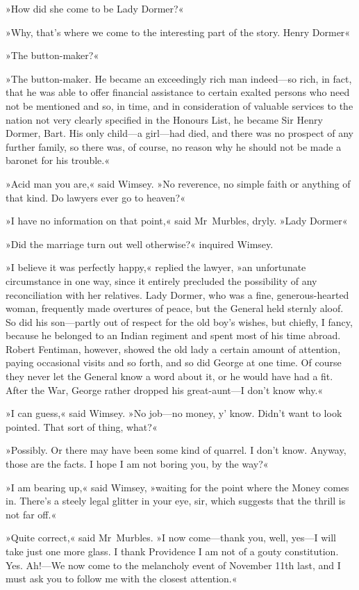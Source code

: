 »How did she come to be Lady Dormer?«

»Why, that's where we come to the interesting part of the story. Henry Dormer\longdash«

»The button-maker?«

»The button-maker. He became an exceedingly rich man indeed—so rich, in fact, that he was able to offer financial assistance to certain exalted persons who need not be mentioned and so, in time, and in consideration of valuable services to the nation not very clearly specified in the Honours List, he became Sir Henry Dormer, Bart. His only child—a girl—had died, and there was no prospect of any further family, so there was, of course, no reason why he should not be made a baronet for his trouble.«

»Acid man you are,« said Wimsey. »No reverence, no simple faith or anything of that kind. Do lawyers ever go to heaven?«

»I have no information on that point,« said Mr~Murbles, dryly. »Lady Dormer\longdash«

»Did the marriage turn out well otherwise?« inquired Wimsey.

»I believe it was perfectly happy,« replied the lawyer, »an unfortunate circumstance in one way, since it entirely precluded the possibility of any reconciliation with her relatives. Lady Dormer, who was a fine, generous-hearted woman, frequently made overtures of peace, but the General held sternly aloof. So did his son—partly out of respect for the old boy's wishes, but chiefly, I fancy, because he belonged to an Indian regiment and spent most of his time abroad. Robert Fentiman, however, showed the old lady a certain amount of attention, paying occasional visits and so forth, and so did George at one time. Of course they never let the General know a word about it, or he would have had a fit. After the War, George rather dropped his great-aunt—I don't know why.«

»I can guess,« said Wimsey. »No job—no money, y' know. Didn't want to look pointed. That sort of thing, what?«

»Possibly. Or there may have been some kind of quarrel. I don't know. Anyway, those are the facts. I hope I am not boring you, by the way?«

»I am bearing up,« said Wimsey, »waiting for the point where the Money comes in. There's a steely legal glitter in your eye, sir, which suggests that the thrill is not far off.«

»Quite correct,« said Mr~Murbles. »I now come—thank you, well, yes—I will take just one more glass. I thank Providence I am not of a gouty constitution. Yes. Ah!—We now come to the melancholy event of November 11th last, and I must ask you to follow me with the closest attention.«

